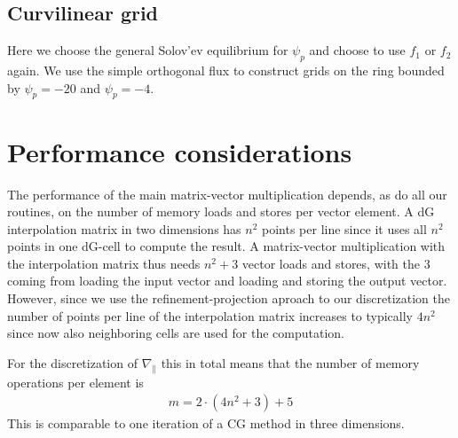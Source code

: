 \subsection{Curvilinear grid}
Here we choose the general Solov'ev equilibrium for
$\psi_p$ and choose to use $f_1$ or $f_2$ again.
We use the simple orthogonal flux to construct
grids on the ring bounded by $\psi_p=-20$ and $\psi_p=-4$.
\section{Performance considerations}
The performance of the main matrix-vector multiplication depends, as do all our
routines, on the number of memory loads and stores per vector element.
A dG interpolation matrix in two dimensions has $n^2$ points per line since
it uses all $n^2$ points in one dG-cell to compute the result.
A matrix-vector multiplication with the interpolation matrix thus needs $n^2+3$
vector loads and stores, with the $3$ coming from loading the input vector and
loading and storing the output vector.
However, since we use the refinement-projection aproach to our discretization
the number of points per line of the interpolation matrix increases to typically
$4n^2$ since now also neighboring cells are used for the computation.

For the discretization of $\nabla_\parallel$ this in total means that the number
of memory operations per element is
\begin{align}
m = 2\cdot(4n^2+3)+5
\end{align}
This is comparable to one iteration of a CG method in three dimensions.











